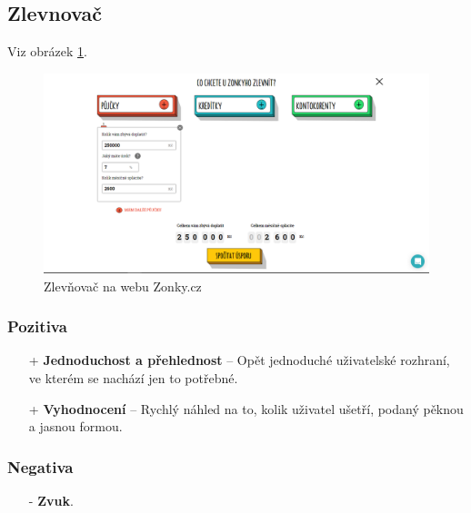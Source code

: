 \newpage
\subsection{Zlevnovač}
Viz obrázek \ref{fig:zonky:zlevnovac}. %
\begin{figure}[h]
    \centering
    \includegraphics[width=1.0\textwidth]{media/zonky/zlevnovac.png}
    \caption{Zlevňovač na webu Zonky.cz}
    \label{fig:zonky:zlevnovac}
\end{figure}
\subsubsection*{Pozitiva}
\begin{itemize}
    \item[+] \textbf{Jednoduchost a přehlednost} -- Opět jednoduché uživatelské rozhraní, ve kterém se nachází jen to potřebné.
    \item[+] \textbf{Vyhodnocení} -- Rychlý náhled na to, kolik uživatel ušetří, podaný pěknou a jasnou formou.
\end{itemize}
\subsubsection*{Negativa}
\begin{itemize}
    \item[-] \textbf{Zvuk}.
\end{itemize}



